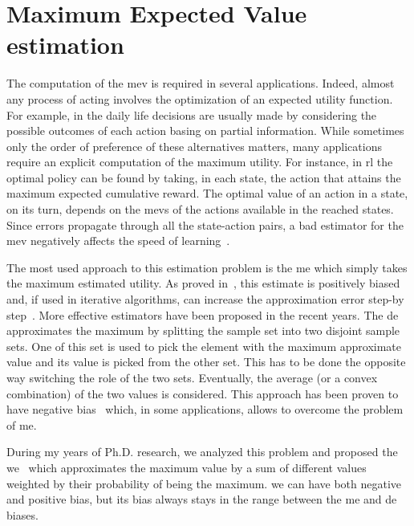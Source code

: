 \chapter{Maximum Expected Value estimation}\label{C:mev}
\newcommand{\est}[1]{\hat\mu_*^{#1}}
\newcommand{\transpose}[1]{{#1}^\texttt{T}}

The computation of the \gls{mev} is required in several applications. Indeed, almost any process of acting involves the optimization of an expected utility function. For example, in the daily life decisions are usually made by considering the possible outcomes of each action basing on partial information.
While sometimes only the order of preference of these alternatives matters, many applications require an explicit computation of the maximum utility.
For instance, in \gls{rl} the optimal policy can be found by taking, in each state, the action that attains the maximum expected cumulative reward. The optimal value of an action in a state, on its turn, depends on the \glspl{mev} of the actions available in the reached states.
Since errors propagate through all the state-action pairs, a bad estimator for the \gls{mev} negatively affects the speed of learning~\cite{van2010double}.

The most used approach to this estimation problem is the \gls{me} which simply takes the maximum estimated utility. As proved in~\cite{smith2006optimizer}, this estimate is positively biased and, if used in iterative algorithms, can increase the approximation error step-by step~\cite{van2010double}. More effective estimators have been proposed in the recent years. The \gls{de}~\cite{van2013estimating} approximates the maximum by splitting the sample set into two disjoint sample sets. One of this set is used to pick the element with the maximum approximate value and its value is picked from the other set. This has to be done the opposite way switching the role of the two sets. Eventually, the average (or a convex combination) of the two values is considered. This approach has been proven to have negative bias~\cite{van2013estimating} which, in some applications, allows to overcome the problem of \gls{me}.

During my years of Ph.D. research, we analyzed this problem and proposed the \gls{we}~\cite{deramo2016estimating} which approximates the maximum value by a sum of different values weighted by their probability of being the maximum. \gls{we} can have both negative and positive bias, but its bias always stays in the range between the \gls{me} and \gls{de} biases.

